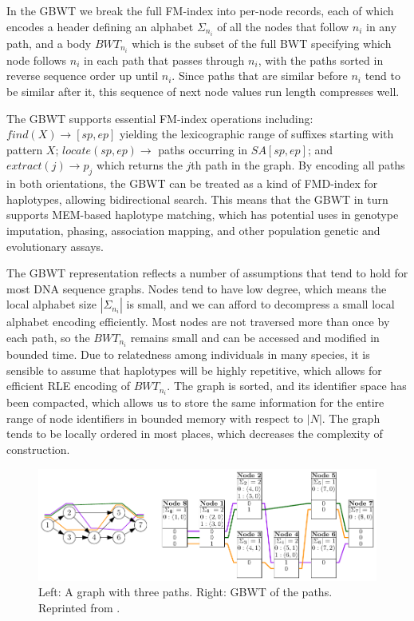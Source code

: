 In the GBWT we break the full FM-index into per-node records, each of which encodes a header defining an alphabet $\Sigma_{n_i}$ of all the nodes that follow $n_i$ in any path, and a body $BWT_{n_i}$ which is the subset of the full BWT specifying which node follows $n_i$ in each path that passes through $n_i$, with the paths sorted in reverse sequence order up until $n_i$.
Since paths that are similar before $n_i$ tend to be similar after it, this sequence of next node values run length compresses well.

The GBWT supports essential FM-index operations including: $find(X) \to [sp, ep]$ yielding the lexicographic range of suffixes starting with pattern $X$; $locate(sp, ep) \to$ paths occurring in $SA[sp, ep]$; and $extract(j) \to p_j$ which returns the $j$th path in the graph.
By encoding all paths in both orientations, the GBWT can be treated as a kind of FMD-index for haplotypes, allowing bidirectional search.
This means that the GBWT in turn supports MEM-based haplotype matching, which has potential uses in genotype imputation, phasing, association mapping, and other population genetic and evolutionary assays.

The GBWT representation reflects a number of assumptions that tend to hold for most DNA sequence graphs.
Nodes tend to have low degree, which means the local alphabet size $|\Sigma_{n_i}|$ is small, and we can afford to decompress a small local alphabet encoding efficiently.
Most nodes are not traversed more than once by each path, so the $BWT_{n_i}$ remains small and can be accessed and modified in bounded time.
Due to relatedness among individuals in many species, it is sensible to assume that haplotypes will be highly repetitive, which allows for efficient RLE encoding of $BWT_{n_i}$.
The graph is sorted, and its identifier space has been compacted, which allows us to store the same information for the entire range of node identifiers in bounded memory with respect to $|N|$.
The graph tends to be locally ordered in most places, which decreases the complexity of construction.

\begin{figure}[htbp!]
  \includegraphics[width=\textwidth]{Chapter2/Figs/gbwt-example.pdf}
  \caption[The Graph Burrows Wheeler Transform]{
    Left: A graph with three paths. Right: GBWT of the paths.
    Reprinted from \cite{siren2018haplotype}.
  }
  \label{fig:gbwt-example}
\end{figure}

